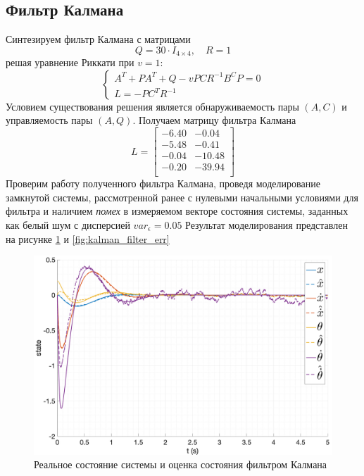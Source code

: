 \FloatBarrier
\subsection{Фильтр Калмана}
Синтезируем фильтр Калмана с матрицами
\begin{equation}
    Q = 30 \cdot I_{4\times 4}, \quad R = 1
\end{equation}
решая уравнение Риккати при $v = 1$:
\begin{equation}
    \begin{cases}
        A^T + PA^T + Q - vPCR^{-1}B^CP = 0 \\ 
        L = -PC^TR^{-1}
    \end{cases}
\end{equation}
Условием существования решения является обнаруживаемость пары $(A, C)$ и управляемость пары $(A, Q)$. 
Получаем матрицу фильтра Калмана
\begin{equation}
    L = \begin{bmatrix}
        -6.40  & -0.04 \\ 
        -5.48  & -0.41 \\ 
        -0.04  & -10.48 \\ 
        -0.20  & -39.94 \\ 
    \end{bmatrix}
\end{equation}
Проверим работу полученного фильтра Калмана, проведя моделирование замкнутой системы, рассмотренной ранее 
с нулевыми начальными условиями для фильтра и наличием \textit{помех} в измеряемом векторе состояния системы,
заданных как белый шум с дисперсией $var_\epsilon = 0.05$ Результат моделирования представлен на рисунке \ref{fig:kalman_filter} и 
\ref{fig:kalman_filter_err}
\begin{figure}[ht!]
    \centering
    \includegraphics[width=\textwidth]{media/plots/kalman/observer_cmp_1.png}
    \caption{Реальное состояние системы и оценка состояния фильтром Калмана}
    \label{fig:kalman_filter}
\end{figure}

